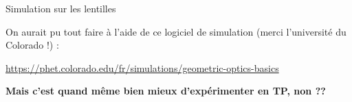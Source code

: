 \begin{facile}{\large Simulation sur les lentilles}
\vspace{0.5cm}
\begin{multicols}{2}
\begin{center}
    On aurait pu tout faire à l'aide de ce logiciel de simulation (merci l'université du Colorado !) :

    \url{https://phet.colorado.edu/fr/simulations/geometric-optics-basics}\\
    \vspace{4cm}
    \begin{Large}
        \textbf{Mais c'est quand même bien mieux d'expérimenter en TP, non ??}
    \end{Large}
\end{center}

\end{multicols}


\end{facile}
